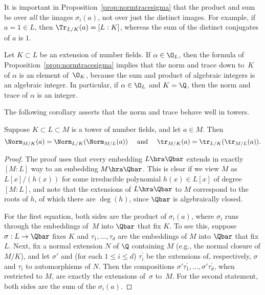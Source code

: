 \begin{warning}
	It is important in Proposition~\ref{prop:normtracesigma} that
	the product and sum be over {\em all} the images $\sigma_i(a)$,
	not over just the distinct images.  For example, if $a=1\in L$, then
	$\Tr_{L/K}(a) = [L:K]$, whereas the sum of the distinct conjugates
	of $a$ is $1$.
\end{warning}

\begin{remark}
	Let $K\subset L$ be an extension of number fields.  If
	$\alpha\in \O_L$, then the formula of
	Proposition~\ref{prop:normtracesigma} implies that the norm and trace
	down to~$K$ of $\alpha$ is an element of~$\O_K$, because the sum and
	product of algebraic integers is an algebraic integer. In particular, if $\alpha \in \O_L$ and $K=\Q$, then the norm and trace of $\alpha$ is an integer. 
\end{remark}

The following corollary asserts that the norm and trace behave well in
towers.
\begin{corollary}
	\label{cor:compatower}
	Suppose $K\subset L \subset M$ is a tower of number fields, and
	let $a\in M$.  Then
	$$
		\Norm_{M/K}(a) = \Norm_{L/K}(\Norm_{M/L}(a))
		\quad\text{ and }\quad
		\tr_{M/K}(a) = \tr_{L/K}(\tr_{M/L}(a)).
	$$
\end{corollary}
\begin{proof}
	The proof uses that every embedding $L\hra \Qbar$ extends in exactly
	$[M:L]$ way to an embedding $M\hra \Qbar$.  This is clear
	if we view $M$ as $L[x]/(h(x))$ for some irreducible
	polynomial $h(x) \in L[x]$ of degree $[M:L]$, and note that
	the extensions of $L\hra \Qbar$ to $M$ correspond to
	the roots of $h$, of which there are $\deg(h)$, since $\Qbar$
	is algebraically closed.
	
	For the first equation, both sides are the product of $\sigma_i(a)$,
	where $\sigma_i$ runs through the embeddings of~$M$ into $\Qbar$
	that fix $K$. To see this, suppose $\sigma:L\to \Qbar$ fixes $K$ and
	$\tau_1,\ldots, \tau_d$ are the embeddings of $M$ into $\Qbar$ that
        fix $L$. Next, fix a normal extension $N$ of $\Q$ containing $M$
	(e.g., the normal closure of $M/K$), and let $\sigma'$ and
	(for each $1 \leq i \leq d$) $\tau_i^'$ be the extensions of,
	respectively, $\sigma$ and $\tau_i$  to automorphisms of $N$.
	Then the compositions $\sigma' \tau_1^{'},\ldots,\sigma'\tau_d^{'}$,
	when restricted to $M$, are exactly the extensions of~$\sigma$ to~$M$.
	For the second statement, both sides are the sum of the $\sigma_i(a)$.
\end{proof}

